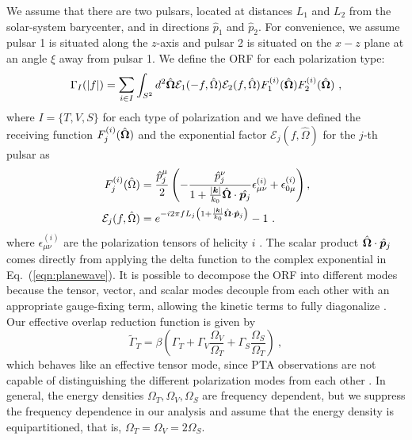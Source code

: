 \documentclass[10pt,prd,twocolumn,aps,nofootinbib,nobibnotes,superscriptaddress,preprintnumbers]{revtex4-2}
\begin{document}
We assume that there are two pulsars, located at distances $L_1$ and $L_2$ from the solar-system barycenter, and in directions $\hat{p}_1$ and $\hat{p}_2$. For convenience, we assume pulsar 1 is situated along the $z$-axis and pulsar 2 is situated on the $x-z$ plane at an angle $\xi$ away from pulsar 1. We define the ORF for each polarization type: 
\begin{equation}\label{eq:orf_type}
    \Gamma_I(|f|) = \mathlarger{\sum}_{i \in I} \int_{S^2} d^2 \hat{\bf{\Omega}} \mathcal{E}_1(-f, \hat{\Omega}) \mathcal{E}_2(f, \hat{\Omega}) F_1^{(i)}(\hat{\bf{\Omega}}) F_2^{(i)}(\hat{\bf{\Omega}}) \ ,
\end{equation}
where $I = \{T,V,S\}$ for each type of polarization and we have defined the receiving function $F^{(i)}_j(\hat{\bf \Omega})$ and the exponential factor $\mathcal{E}_j(f, \hat{\Omega})$ for the $j$-th pulsar as 
\begin{equation}\label{eqn:recieving}
    \begin{aligned}
        F^{(i)}_j(\hat{\Omega}) &= \frac{\hat{p}^\mu_j}{2}\left(-\frac{\hat{p}^\nu_j}{1+\frac{|\boldsymbol{k}|}{k_0} \hat{\boldsymbol{\Omega}} \cdot \hat{{\boldsymbol{p}}_j}} \epsilon_{\mu \nu}^{(i)}+\epsilon_{0 \mu}^{(i)}\right) , \\ 
        \mathcal{E}_j(f, \hat{\Omega}) &= e^{-i2\pi f L_j\left( 1 + \frac{|\boldsymbol{k}|}{k_0} \hat{\bf \Omega}\cdot \hat{\boldsymbol{p}}_j\right)} - 1 \ . 
    \end{aligned}
\end{equation}
where $\epsilon_{\mu\nu}^{(i)}$ are the polarization tensors of helicity $i$ \cite{Liang:2021bct}. The scalar product $\hat{\bf \Omega}\cdot \hat{\boldsymbol{p}}_j$ comes directly from applying the delta function to the complex exponential in 
Eq.~(\ref{eqn:planewave}). 
It is possible to decompose the ORF into different modes because the tensor, vector, and scalar modes decouple from each other with an appropriate gauge-fixing term, allowing the kinetic terms to fully diagonalize \cite{Hinterbichler:2011tt}. Our effective overlap reduction function is given by 
\begin{equation}\label{eq:eff_orf}
    \tilde{\Gamma}_{T} = \beta \left(\Gamma_{T} + \Gamma_{V} \frac{\Omega_V}{\Omega_T} + \Gamma_{S} \frac{\Omega_S}{\Omega_T} \right) \ ,
\end{equation}
which behaves like an effective tensor mode, since PTA observations are not capable of distinguishing the different polarization modes from each other \cite{Liang:2021bct}. In general, the energy densities $\Omega_T, \Omega_V,\Omega_S$ are frequency dependent, but we suppress the frequency dependence in our analysis and assume that the energy density is equipartitioned, that is, $\Omega_T = \Omega_V = 2\Omega_S$.
\end{document}
